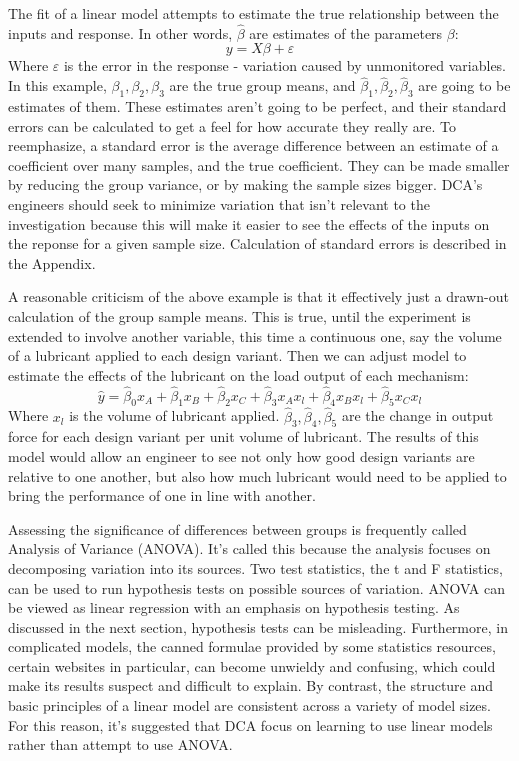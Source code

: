 \documentclass[11pt,a4paper,article]{memoir} %
\begin{document}
The fit of a linear model attempts to estimate the true relationship between the inputs and response. In other words, $\hat{\beta}$ are estimates of the parameters $\beta$:
\begin{equation}
	y = X\beta + \varepsilon
\end{equation}
Where $\varepsilon$ is the error in the response - variation caused by unmonitored variables. In this example, $\beta_1, \beta_2, \beta_3$ are the true group means, and $\hat{\beta}_1, \hat{\beta}_2, \hat{\beta}_3$ are going to be estimates of them. These estimates aren't going to be perfect, and their standard errors can be calculated to get a feel for how accurate they really are. To reemphasize, a standard error is the average difference between an estimate of a coefficient over many samples, and the true coefficient. They can be made smaller by reducing the group variance, or by making the sample sizes bigger.  DCA's engineers should seek to minimize variation that isn't relevant to the investigation because this will make it easier to see the effects of the inputs on the reponse for a given sample size. Calculation of standard errors is described in the Appendix.

A reasonable criticism of the above example is that it effectively just a drawn-out calculation of the group sample means. This is true, until the experiment is extended to involve another variable, this time a continuous one, say the volume of a lubricant applied to each design variant. Then we can adjust model to estimate the effects of the lubricant on the load output of each mechanism:
\begin{equation}
	\hat{y} = \hat{\beta}_0 x_A + \hat{\beta}_{1}x_B + \hat{\beta}_{2}x_C + \hat{\beta}_3 x_A x_l + \hat{\beta}_4 x_B x_l + \hat{\beta}_5 x_C x_l
\end{equation}
Where $x_l$ is the volume of lubricant applied. $\hat{\beta}_3, \hat{\beta}_4, \hat{\beta}_5$ are the change in output force for each design variant per unit volume of lubricant. The results of this model would allow an engineer to see not only how good design variants are relative to one another, but also how much lubricant would need to be applied to bring the performance of one in line with another.

Assessing the significance of differences between groups is frequently called Analysis of Variance (ANOVA). It's called this because the analysis focuses on decomposing variation into its sources. Two test statistics, the t and F statistics, can be used to run hypothesis tests on possible sources of variation. ANOVA can be viewed as linear regression with an emphasis on hypothesis testing. As discussed in the next section, hypothesis tests can be misleading. Furthermore, in complicated models, the canned formulae provided by some statistics resources, certain websites in particular, can become unwieldy and confusing, which could make its results suspect and difficult to explain. By contrast, the structure and basic principles of a linear model are consistent across a variety of model sizes. For this reason, it's suggested that DCA focus on learning to use linear models rather than attempt to use ANOVA.
\end{document}
